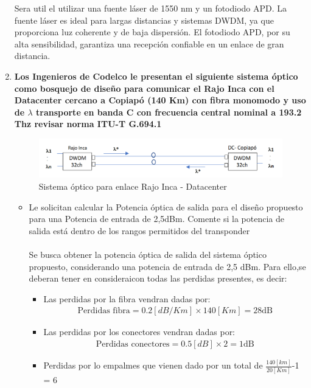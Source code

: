 \begin{enumerate}
	Sera util el utilizar una fuente láser de 1550 nm y un fotodiodo APD. La fuente láser es ideal para largas distancias y sistemas DWDM, ya que proporciona luz coherente y de baja dispersión. El fotodiodo APD, por su alta sensibilidad, garantiza una recepción confiable en un enlace de gran distancia.
	\item \textbf{Los Ingenieros de Codelco le presentan el siguiente sistema óptico como bosquejo de diseño para comunicar el Rajo Inca con el Datacenter cercano a Copiapó (140 Km) con fibra monomodo y uso de $\lambda$ transporte en banda C con frecuencia central nominal a 193.2 Thz revisar norma ITU-T G.694.1}
	\begin{figure}
		\centering
		\includegraphics[width=0.7\linewidth]{img/Figure_3_0}
		\caption{Sistema óptico para enlace Rajo Inca - Datacenter}
		\label{fig:5}
	\end{figure}
	\begin{itemize}
		\item Le solicitan calcular la Potencia óptica de salida para el diseño propuesto para una Potencia de entrada de 2,5dBm. Comente si la potencia de salida está dentro de los rangos permitidos del transponder\\\\
		Se busca obtener la potencia óptica de salida del sistema óptico propuesto, considerando una potencia de entrada de 2,5 dBm. Para ello,se deberan tener en consideraicon todas las perdidas presentes, es decir:
		\begin{itemize}
			\item Las perdidas por la fibra vendran dadas por:
			\begin{align}
				\text{Perdidas fibra} = 0.2 [dB/Km] \times 140[Km] = 28 \text{dB}
			\end{align}
			\item Las perdidas por los conectores vendran dadas por:
			\begin{align}
				\text{Perdidas conectores} = 0.5 [dB] \times 2 = 1 \text{dB}
			\end{align}
			\item Perdidas por lo empalmes que vienen dado por un total de $\frac{140[km]}{20[Km]}$-1 = 6
			\begin{align}

\end{align}
\end{itemize}
\end{itemize}
\end{enumerate}
